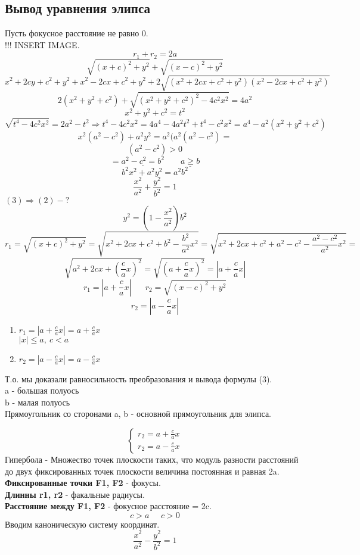 \documentclass[12pt, paper]{article}
\begin{document}
\subsection{Вывод уравнения элипса}
Пусть фокусное расстояние не равно 0.\\
!!! INSERT IMAGE.\\
\begin{equation}
	r_1 + r_2 = 2a
	\label{eq:Вывод}
\end{equation}
\begin{equation}	
	\sqrt{ (x + c)^2 + y^2 } + \sqrt{(x - c)^2 + y^2}
	\label{eq:}
\end{equation}
\[	x^2 + 2cy + c^2 + y^2 + x^2 - 2cx + c^2 + y^2  + 2\sqrt{(x^2 + 2cx + c^2 + y^2)(x^2 - 2cx + c^2 + y^2)} \]
\[ 2( x^2 + y^2 + c^2) + \sqrt{(x^2 + y^2 + c^2) ^ 2 - 4c^2x^2} = 4a^2 \]
\[ x^2 + y^2 + c^2 = t^2 \]
\[ \sqrt{t^4 - 4c^2x^2} = 2a^2 - t^2 \Rightarrow t^4 - 4c^2x^2 = 4a^4 - 4a^2t^2 + t^4 - c^2x^2 = a^4 - a^2(x^2 + y^2 + c^2) \]
\[ x^2(a^2 - c^2) + a^2y^2 = a^2(a^2(a^2-c^2) = \]
\[ (a^2 - c^2) > 0 \]
\[ = \underline{a^2 - c^2 = b^2}\;\;\;\;\;\;\; \underline{a  \geq b} \]
\[ b^2x^2 + a^2y^2 = a^2b^2 \]
\begin{equation}
	\frac{x^2}{a^2} + \frac{y^2}{b^2} = 1
	\label{eq:}
\end{equation}
$(3) \Rightarrow (2) - ?$\\
\[ y^2 = (1 - \frac{x^2}{a^2})b^2 \]
\[ r_1 = \sqrt{(x+c)^2 + y^2} = \sqrt{x^2 + 2cx + c^2 + b^2 - \frac{b^2}{a^2}x^2} = \sqrt{x^2 + 2cx + c^2 + a^2 - c^2 - \frac{a^2 - c^2}{a^2}x^2} =\]
\[\sqrt{a^2 + 2cx + (\frac{c}{a}x)^2} = \sqrt{(a + \frac{c}{a}x)^2} = |a + \frac{c}{a}x| \]
\[ r_1 = |a + \frac{c}{a}x| \;\;\;\;\;\; r_2 = \sqrt{(x - c)^2 + y^2} \]
\[ r_2 = |a - \frac{c}{a}x| \]
\begin{enumerate}
	\item $r_1 = |a + \frac{c}{a}x| = a + \frac{c}{a}x$\\
		$|x| \leq a,\ c < a$
	\item $r_2 = |a - \frac{c}{a}x| = a - \frac{c}{a}x$
\end{enumerate}
Т.о. мы доказали равносильность преобразования и вывода формулы (3).\\
a - большая полуось\\
b - малая полуось\\
Прямоугольник со сторонами a, b - основной прямоугольник для элипса.

\begin{equation}
	\begin{cases}
		r_2 = a + \frac{c}{a}x\\
		r_2 = a - \frac{c}{a}x
	\end{cases}
	\label{eq:}
\end{equation}
Гипербола - Множество точек плоскости таких, что модуль разности расстояний до двух фиксированных точек плоскости величина постоянная и равная 2a.\\
\textbf{Фиксированные точки F1, F2} - фокусы.\\
\textbf{Длинны r1, r2} - факальные радиусы.\\
\textbf{Расстояние между F1, F2} - фокусное расстояние = 2c.
\[c > a \;\;\;\;\; c > 0\]
Вводим каноническую систему координат.\\
\[ \frac{x^2}{a^2} - \frac{y^2}{b^2} = 1 \]
\end{document}
